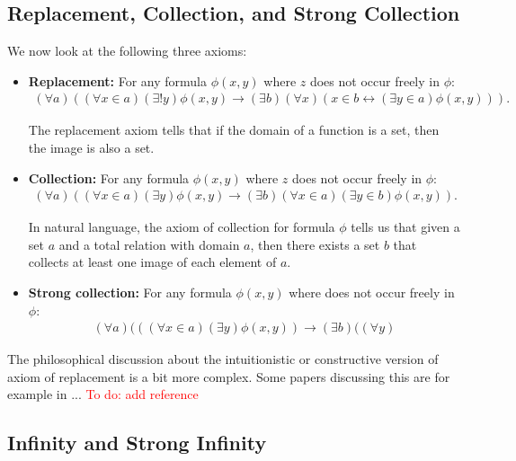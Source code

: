 \documentclass[12pt, a4paper]{article}
\theoremstyle{definition}
\theoremstyle{plain}
\begin{document}
\subsection{Replacement, Collection, and Strong Collection}


We now look at the following three axioms:
\begin{itemize}
\item {\bf Replacement:} For any formula $\phi(x,y)$ where $z$ does not occur freely in $\phi$:
\begin{align*}
(\forall a)((\forall x \in a)(\exists ! y)\phi(x,y) \rightarrow (\exists b)(\forall x)(x \in b \leftrightarrow (\exists y \in a)\phi(x,y))).
\end{align*}

The replacement axiom tells that if the domain of a function is a set, then the image is also a set. 
\item {\bf Collection:} For any formula $\phi(x,y)$ where $z$ does not occur freely in $\phi$:
\begin{align*}
(\forall a)((\forall x \in a)(\exists  y)\phi(x,y) \rightarrow (\exists b)(\forall x \in a)(\exists y \in b)\phi(x,y)).
\end{align*}

In natural language, the axiom of collection for formula $\phi$ tells us that given a set $a$ and a total relation with domain $a$, then there exists a set $b$ that collects at least one image of each element of $a$.

\item {\bf Strong collection:} For any formula $\phi(x,y)$ where does not occur freely in $\phi$:
\begin{align*}
(\forall a)(((\forall x \in a)(\exists y)\phi(x,y)) \rightarrow (\exists b)((\forall y) 
\end{align*}
\end{itemize}

The philosophical discussion about the intuitionistic or constructive version of axiom of replacement is a bit more complex.
Some papers discussing this are for example in ... \textcolor{red}{To do: add reference}

\subsection{Infinity and Strong Infinity}
\end{document}
